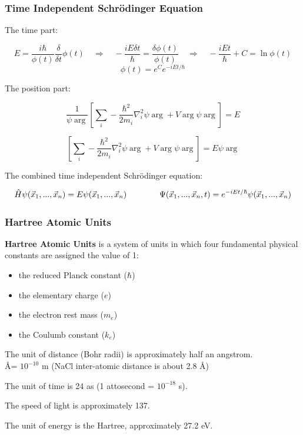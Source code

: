 \documentclass{beamer}
\begin{document}
\begin{frame}
\frametitle{Time Independent Schr\"odinger Equation}
The time part:

\[ E = \frac{i\hbar}{\phi(t)} \frac{\delta}{\delta t} \phi(t) \quad\Rightarrow\quad - \frac{i E \delta t}{\hbar} = \frac{\delta\phi(t)}{\phi(t)} \quad\Rightarrow\quad - \frac{i E t}{\hbar} + C = \ln \phi(t) \]
\[ \phi(t) = e^C e^{-iEt/\hbar}\]

The position part:

\[ \frac{1}{\psi\arg} \left[ \sum_i - \frac{\hbar^2}{2m_i}\nabla_i^2 \psi\arg + V\arg\psi\arg \right] = E \]

\[ \left[ \sum_i - \frac{\hbar^2}{2m_i}\nabla_i^2 \psi\arg + V\arg\psi\arg \right] = E \psi\arg \]

The combined time independent Schr\"odinger equation:

\[ \hat{H} \psi(\vec{x}_1,...,\vec{x}_n) = E \psi(\vec{x}_1,...,\vec{x}_n) \qquad\qquad \Psi(\vec{x}_1,...,\vec{x}_n,t) = e^{-iEt/\hbar} \psi(\vec{x}_1,...,\vec{x}_n)\]
\end{frame}

\begin{frame}
\frametitle{Hartree Atomic Units}
{\bf Hartree Atomic Units} is a system of units in which four fundamental physical constants
are assigned the value of 1:
\begin{itemize}
\item the reduced Planck constant ($\hbar$)
\item the elementary charge ($e$)
\item the electron rest mass ($m_e$)
\item the Coulumb constant ($k_e$)
\end{itemize}

The unit of distance (Bohr radii) is approximately half an angstrom.\\
\qquad \AA = $10^{-10}$ m (NaCl inter-atomic distance is about 2.8 \AA)

The unit of time is 24 as (1 attosecond = $10^{-18}$ s).

The speed of light is approximately 137.

The unit of energy is the Hartree, approximately 27.2 eV.
\end{frame}
\end{document}
